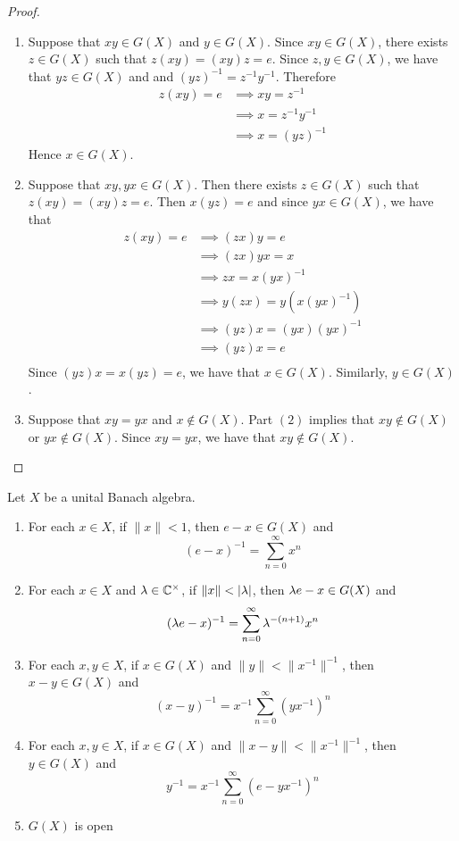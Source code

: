 \documentclass{book}
\begin{document}
\begin{proof}\
	\begin{enumerate}
	\item Suppose that $xy \in G(X)$ and $y \in G(X)$. Since $xy \in G(X)$, there exists $z \in G(X)$ such that $z(xy) = (xy)z = e$. Since $z, y \in G(X)$, we have that $yz \in G(X)$ and and $(yz)^{-1} = z^{-1}y^{-1}$. Therefore
	\begin{align*}
		z(xy) = e
		& \implies xy = z^{-1} \\
		& \implies x = z^{-1} y^{-1} \\
		& \implies x = (yz)^{-1}
	\end{align*} 
	Hence $x \in G(X)$.
	\item Suppose that $xy, yx \in G(X)$. Then there exists $z \in G(X)$ such that $z(xy) = (xy)z = e$. Then $x(yz) = e$ and since $yx \in G(X)$, we have that
	\begin{align*}
		z(xy) = e
		& \implies (zx)y = e \\
		& \implies (zx)yx = x \\
		& \implies zx = x(yx)^{-1} \\
		& \implies y(zx) = y(x(yx)^{-1}) \\
		& \implies (yz)x = (yx)(yx)^{-1} \\
		& \implies (yz)x = e \\
	\end{align*}
	Since $(yz)x = x(yz) = e$, we have that $x \in G(X)$. Similarly, $y \in G(X)$.
	\item Suppose that $xy = yx$ and $x \not \in G(X)$. Part $(2)$ implies that $xy \not \in G(X)$ or $yx \not \in G(X)$. Since $xy = yx$, we have that $xy \not \in G(X)$.
	\end{enumerate}
\end{proof}

\begin{ex} \lex{}
	Let $X$ be a unital Banach algebra. 
	\begin{enumerate}
		\item For each $x \in X$, if $\|x \|< 1$, then $e - x \in G(X)$ and $$(e-x)^{-1} = \sum_{n=0}^{\infty}x^n$$
		\item For each $x \in X$ and $\lambda \in \mathbb{C}^{\times}$, if $\|x\| < |\lambda |$, then $\lambda e - x \in G(X)$ and 
		$$(\lambda e - x)^{-1} = \sum_{n=0}^{\infty} \lambda^{-(n+1)} x^n $$
		\item For each $x,y \in X$, if $x \in G(X)$  and $\|y \|< \|x^{-1} \|^{-1}$, then $x - y \in G(X)$ and $$(x-y)^{-1} = x^{-1}\sum_{n=0}^{\infty} (yx^{-1})^n$$
		\item For each $x,y \in X$, if $x \in G(X)$  and $\| x - y \|< \|x^{-1} \|^{-1}$, then $y \in G(X)$ and $$y^{-1} = x^{-1}\sum_{n=0}^{\infty} (e - yx^{-1})^n$$
		\item $G(X)$ is open
	\end{enumerate}
\end{ex}
\end{document}
